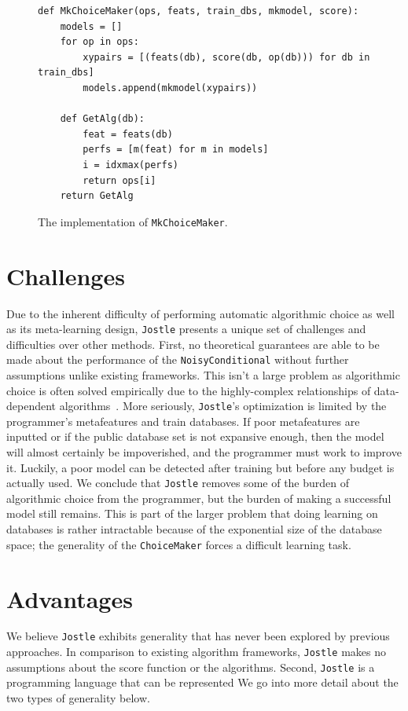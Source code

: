 \documentclass[11pt]{report}
\newcommand{\Jostle}{\texttt{Jostle}}
\renewcommand{\t}[1]{\texttt{#1}}
\begin{document}
\begin{figure}
\begin{lstlisting}[style=MyPythonStyle]
def MkChoiceMaker(ops, feats, train_dbs, mkmodel, score):
    models = []
    for op in ops:
        xypairs = [(feats(db), score(db, op(db))) for db in train_dbs]
        models.append(mkmodel(xypairs))

    def GetAlg(db):
        feat = feats(db)
        perfs = [m(feat) for m in models]
        i = idxmax(perfs)
        return ops[i]
    return GetAlg
\end{lstlisting}
\caption{The implementation of \t{MkChoiceMaker}. }\label{fig:choicemaker}
\end{figure}

\section{Challenges}
Due to the inherent difficulty of performing automatic algorithmic choice as well as its meta-learning design, \Jostle{} presents a unique set of challenges and difficulties over other methods. First, no theoretical guarantees are able to be made about the performance of the \t{NoisyConditional} without further assumptions unlike existing frameworks. This isn't a large problem as algorithmic choice is often solved empirically due to the highly-complex relationships of data-dependent algorithms~\cite{Hay:2016}. More seriously, \Jostle{}'s optimization is limited by the programmer's metafeatures and train databases. If poor metafeatures are inputted or if the public database set is not expansive enough, then the model will almost certainly be impoverished, and the programmer must work to improve it. Luckily, a poor model can be detected after training but before any budget is actually used. We conclude that \Jostle{} removes some of the burden of algorithmic choice from the programmer, but the burden of making a successful model still remains. This is part of the larger problem that doing learning on databases is rather intractable because of the exponential size of the database space; the generality of the \t{ChoiceMaker} forces a difficult learning task.

\section{Advantages}
We believe \Jostle{} exhibits generality that has never been explored by previous approaches. In comparison to existing algorithm frameworks, \Jostle{} makes no assumptions about the score function or the algorithms. Second, \Jostle{} is a programming language that can be represented  We go into more detail about the two types of generality below.
\end{document}
